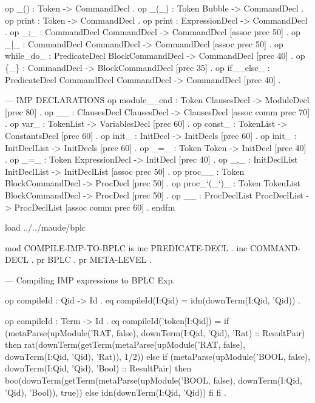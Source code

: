 \documentclass{llncs}%
\begin{document}
    op _() : Token -> CommandDecl .
    op _(_) : Token Bubble -> CommandDecl .
    op print : Token -> CommandDecl .
    op print : ExpressionDecl -> CommandDecl .
    op _;_ : CommandDecl CommandDecl -> CommandDecl [assoc prec 50] .
    op _|_ : CommandDecl CommandDecl -> CommandDecl [assoc prec 50] .
    op while_do_ : PredicateDecl BlockCommandDecl -> CommandDecl [prec 40] .
    op \{_\} : CommandDecl -> BlockCommandDecl [prec 35] .
    op if__else_ : PredicateDecl CommandDecl CommandDecl -> CommandDecl [prec 40] .

    --- IMP DECLARATIONS
        op module__end : Token ClausesDecl -> ModuleDecl [prec 80] .
    op __ : ClausesDecl ClausesDecl -> ClausesDecl [assoc comm prec 70] .
    op var_ : TokenList -> VariablesDecl [prec 60] .
    op const_ : TokenList -> ConstantsDecl [prec 60] .
    op init_ : InitDecl -> InitDecls [prec 60] .
    op init_ : InitDeclList -> InitDecls  [prec 60] .
    op _=_ : Token Token -> InitDecl  [prec 40] .
    op _=_ : Token ExpressionDecl -> InitDecl  [prec 40] .
    op _,_ : InitDeclList InitDeclList -> InitDeclList  [assoc prec 50] .
    op proc__ : Token BlockCommandDecl -> ProcDecl [prec 50] .
    op proc_`(_`)_ : Token TokenList BlockCommandDecl -> ProcDecl  [prec 50] .
    op __ : ProcDeclList ProcDeclList -> ProcDeclList  [assoc comm prec 60] .
endfm
\nwendcode{}\nwdocspar

\nwenddocs{}\endmoddef\nwstartdeflinemarkup\nwenddeflinemarkup
load ../../maude/bplc

mod COMPILE-IMP-TO-BPLC is
        inc PREDICATE-DECL .
        inc COMMAND-DECL .
    pr BPLC .
        pr META-LEVEL .

        --- Compiling IMP expressions to BPLC Exp.

    op compileId : Qid -> Id .
        eq compileId(I:Qid) = idn(downTerm(I:Qid, 'Qid)) .

    op compileId : Term -> Id .
    eq compileId('token[I:Qid]) =
       if (metaParse(upModule('RAT, false), downTerm(I:Qid, 'Qid), 'Rat)  :: ResultPair)
           then rat(downTerm(getTerm(metaParse(upModule('RAT, false),
                    downTerm(I:Qid, 'Qid), 'Rat)), 1/2))
           else
             if (metaParse(upModule('BOOL, false), downTerm(I:Qid, 'Qid), 'Bool) :: ResultPair)
             then boo(downTerm(getTerm(metaParse(upModule('BOOL, false),
                      downTerm(I:Qid, 'Qid), 'Bool)), true))
             else idn(downTerm(I:Qid, 'Qid))
             fi
           fi .
\end{document}
